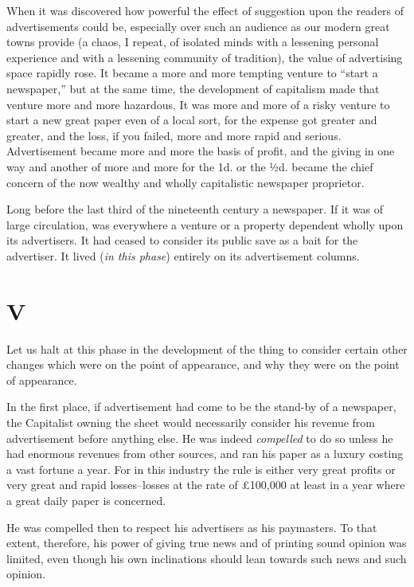 \documentclass{book}
\begin{document}
When it was discovered how powerful the effect of suggestion upon the readers of advertisements could be, especially over such an audience as our modern great towns provide (a chaos, I repeat, of isolated minds with a lessening personal experience and with a lessening community of tradition), the value of advertising space rapidly rose. It became a more and more tempting venture to “start a newspaper,” but at the same time, the development of capitalism made that venture more and more hazardous. It was more and more of a risky venture to start a new great paper even of a local sort, for the expense got greater and greater, and the loss, if you failed, more and more rapid and serious. Advertisement became more and more the basis of profit, and the giving in one way and another of more and more for the 1d. or the ½d. became the chief concern of the now wealthy and wholly capitalistic newspaper proprietor.

Long before the last third of the nineteenth century a newspaper. If it was of large circulation, was everywhere a venture or a property dependent wholly upon its advertisers. It had ceased to consider its public save as a bait for the advertiser. It lived (\emph{in this phase}) entirely on its advertisement columns.

\chapter*{V}
\label{chapter-6}
Let us halt at this phase in the development of the thing to consider certain other changes which were on the point of appearance, and why they were on the point of appearance.

In the first place, if advertisement had come to be the stand-by of a newspaper, the Capitalist owning the sheet would necessarily consider his revenue from advertisement before anything else. He was indeed \emph{compelled} to do so unless he had enormous revenues from other sources, and ran his paper as a luxury costing a vast fortune a year. For in this industry the rule is either very great profits or very great and rapid losses–losses at the rate of £100,000 at least in a year where a great daily paper is concerned.

He was compelled then to respect his advertisers as his paymasters. To that extent, therefore, his power of giving true news and of printing sound opinion was limited, even though his own inclinations should lean towards such news and such opinion.
\end{document}
